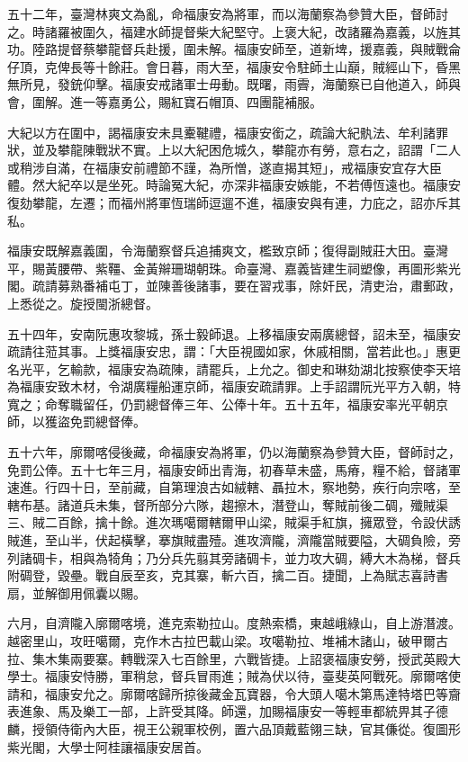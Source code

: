 \begin{pinyinscope}
五十二年，臺灣林爽文為亂，命福康安為將軍，而以海蘭察為參贊大臣，督師討之。時諸羅被圍久，福建水師提督柴大紀堅守。上褒大紀，改諸羅為嘉義，以旌其功。陸路提督蔡攀龍督兵赴援，圍未解。福康安師至，道新埤，援嘉義，與賊戰侖仔頂，克俾長等十餘莊。會日暮，雨大至，福康安令駐師土山巔，賊經山下，昏黑無所見，發銃仰擊。福康安戒諸軍士毋動。既曙，雨霽，海蘭察已自他道入，師與會，圍解。進一等嘉勇公，賜紅寶石帽頂、四團龍補服。

大紀以方在圍中，謁福康安未具櫜鞬禮，福康安銜之，疏論大紀骫法、牟利諸罪狀，並及攀龍陳戰狀不實。上以大紀困危城久，攀龍亦有勞，意右之，詔謂「二人或稍涉自滿，在福康安前禮節不謹，為所憎，遂直揭其短」，戒福康安宜存大臣體。然大紀卒以是坐死。時論冤大紀，亦深非福康安嫉能，不若傅恆遠也。福康安復劾攀龍，左遷；而福州將軍恆瑞師逗遛不進，福康安與有連，力庇之，詔亦斥其私。

福康安既解嘉義圍，令海蘭察督兵追捕爽文，檻致京師；復得副賊莊大田。臺灣平，賜黃腰帶、紫韁、金黃辮珊瑚朝珠。命臺灣、嘉義皆建生祠塑像，再圖形紫光閣。疏請募熟番補屯丁，並陳善後諸事，要在習戎事，除奸民，清吏治，肅郵政，上悉從之。旋授閩浙總督。

五十四年，安南阮惠攻黎城，孫士毅師退。上移福康安兩廣總督，詔未至，福康安疏請往蒞其事。上獎福康安忠，謂：「大臣視國如家，休戚相關，當若此也。」惠更名光平，乞輸款，福康安為疏陳，請罷兵，上允之。御史和琳劾湖北按察使李天培為福康安致木材，令湖廣糧船運京師，福康安疏請罪。上手詔謂阮光平方入朝，特寬之；命奪職留任，仍罰總督俸三年、公俸十年。五十五年，福康安率光平朝京師，以獲盜免罰總督俸。

五十六年，廓爾喀侵後藏，命福康安為將軍，仍以海蘭察為參贊大臣，督師討之，免罰公俸。五十七年三月，福康安師出青海，初春草未盛，馬瘠，糧不給，督諸軍速進。行四十日，至前藏，自第理浪古如絨轄、聶拉木，察地勢，疾行向宗喀，至轄布基。諸道兵未集，督所部分六隊，趨擦木，潛登山，奪賊前後二碉，殲賊渠三、賊二百餘，擒十餘。進次瑪噶爾轄爾甲山梁，賊渠手紅旗，擁眾登，令設伏誘賊進，至山半，伏起橫擊，搴旗賊盡殪。進攻濟隴，濟隴當賊要隘，大碉負險，旁列諸碉卡，相與為犄角；乃分兵先翦其旁諸碉卡，並力攻大碉，縛大木為梯，督兵附碉登，毀壘。戰自辰至亥，克其寨，斬六百，擒二百。捷聞，上為賦志喜詩書扇，並解御用佩囊以賜。

六月，自濟隴入廓爾喀境，進克索勒拉山。度熱索橋，東越峨綠山，自上游潛渡。越密里山，攻旺噶爾，克作木古拉巴載山梁。攻噶勒拉、堆補木諸山，破甲爾古拉、集木集兩要寨。轉戰深入七百餘里，六戰皆捷。上詔褒福康安勞，授武英殿大學士。福康安恃勝，軍稍怠，督兵冒雨進；賊為伏以待，臺斐英阿戰死。廓爾喀使請和，福康安允之。廓爾喀歸所掠後藏金瓦寶器，令大頭人噶木第馬達特塔巴等齎表進象、馬及樂工一部，上許受其降。師還，加賜福康安一等輕車都統畀其子德麟，授領侍衛內大臣，視王公親軍校例，置六品頂戴藍翎三缺，官其傔從。復圖形紫光閣，大學士阿桂讓福康安居首。


\end{pinyinscope}
